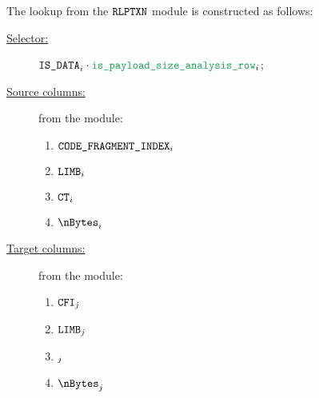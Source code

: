The lookup from the $\texttt{RLPTXN}$ module is constructed as follows:
\begin{description}
	\item[\underline{Selector:}] 
		$ \phaseData _{i} \cdot \locIsPayloadSizeAnalysisRow _{i} $;
	\item[\underline{Source columns:}]
		from the \rlpTxnMod{} module:
	\begin{multicols}{3}
	\begin{enumerate}
		\item $\texttt{CODE\_FRAGMENT\_INDEX}{}  _{i}$
		\item $\texttt{LIMB}   _{i}$
		\item $\texttt{CT}     _{i}$
		\item $\nBytes _{i}$
	\end{enumerate}
	\end{multicols}
\item[\underline{Target columns:}] from the \romMod{} module: 
	\begin{multicols}{3}
	\begin{enumerate}
		\item $\texttt{CFI}    _{j}$
		\item $\texttt{LIMB}   _{j}$
		\item $\index  _{j}$
		\item $\nBytes _{j}$
	\end{enumerate} 
	\end{multicols}
\end{description}
